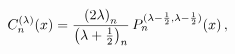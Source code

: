 \[\mathop{C^{(\lambda)}_{n}\/}\nolimits\!\left(x\right)=\frac{\left(2\lambda%
\right)_{n}}{\left(\lambda+\frac{1}{2}\right)_{n}}\mathop{P^{(\lambda-\frac{1}%
{2},\lambda-\frac{1}{2})}_{n}\/}\nolimits\!\left(x\right),\]